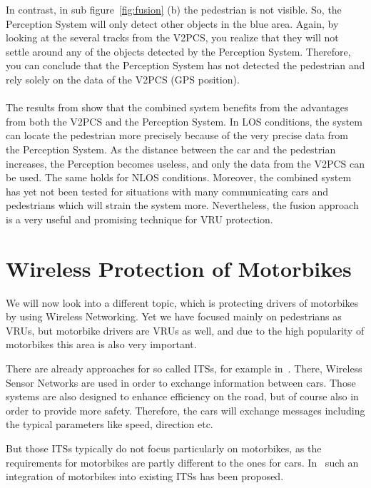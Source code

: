 \documentclass[]{ccs-thesis}
\begin{document}
In contrast, in sub figure~\ref{fig:fusion} (b) the pedestrian is not visible. So, the Perception System will only detect other objects in the blue area. Again, by looking at the several tracks from the \ac{V2PCS}, you realize that they will not settle around any of the objects detected by the Perception System. Therefore, you can conclude that the Perception System has not detected the pedestrian and rely solely on the data of the \ac{V2PCS} (GPS position).
\\\\
The results from \cite{2016fusion} show that the combined system benefits from the advantages from both the \ac{V2PCS} and the Perception System. In \ac{LOS} conditions, the system can locate the pedestrian more precisely because of the very precise data from the Perception System. As the distance between the car and the pedestrian increases, the Perception becomes useless, and only the data from the \ac{V2PCS} can be used. The same holds for \ac{NLOS} conditions. Moreover, the combined system has yet not been tested for situations with many communicating cars and pedestrians which will strain the system more. Nevertheless, the fusion approach is a very useful and promising technique for \ac{VRU} protection.

\section{Wireless Protection of Motorbikes}\label{sec:motorbikes}

We will now look into a different topic, which is protecting drivers of motorbikes by using Wireless Networking. Yet we have focused mainly on pedestrians as \acp{VRU}, but motorbike drivers are \acp{VRU} as well, and due to the high popularity of motorbikes this area is also very important. 

There are already approaches for so called \acp{ITS}, for example in~\cite{its}. There, Wireless Sensor Networks are used in order to exchange information between cars.  Those systems are also designed to enhance efficiency on the road, but of course also in order to provide more safety. Therefore, the cars will exchange messages including the typical parameters like speed, direction etc.

But those \acp{ITS} typically do not focus particularly on motorbikes, as the requirements for motorbikes are partly different to the ones for cars. In~\cite{bikes} such an integration of motorbikes into existing \acp{ITS} has been proposed.
\end{document}
